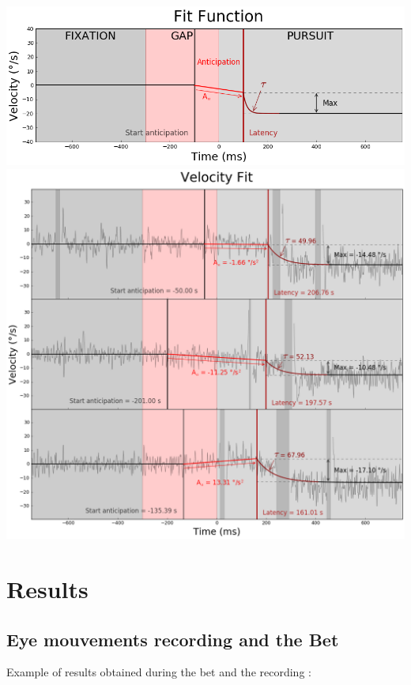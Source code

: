 \documentclass[profile,final,english, draft]{article}%
\begin{document}
\begin{center} 
    \includegraphics[width=1\linewidth]{Fonction_Fit}
    \includegraphics[width=1\linewidth]{Fit_vitesse}
\end{center}

\section*{Results}

\subsection*{Eye mouvements recording and the Bet}

Example of results obtained during the bet and the recording :
\end{document}
